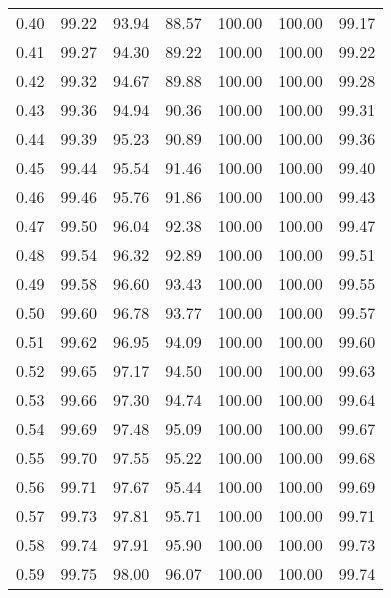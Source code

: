 \begin{tabular}{|c|c|c|c|c|c|c|}
      0.40 &     99.22 &     93.94 &      88.57 &  100.00 &     100.00 &         99.17 \\
      0.41 &     99.27 &     94.30 &      89.22 &  100.00 &     100.00 &         99.22 \\
      0.42 &     99.32 &     94.67 &      89.88 &  100.00 &     100.00 &         99.28 \\
      0.43 &     99.36 &     94.94 &      90.36 &  100.00 &     100.00 &         99.31 \\
      0.44 &     99.39 &     95.23 &      90.89 &  100.00 &     100.00 &         99.36 \\
      0.45 &     99.44 &     95.54 &      91.46 &  100.00 &     100.00 &         99.40 \\
      0.46 &     99.46 &     95.76 &      91.86 &  100.00 &     100.00 &         99.43 \\
      0.47 &     99.50 &     96.04 &      92.38 &  100.00 &     100.00 &         99.47 \\
      0.48 &     99.54 &     96.32 &      92.89 &  100.00 &     100.00 &         99.51 \\
      0.49 &     99.58 &     96.60 &      93.43 &  100.00 &     100.00 &         99.55 \\
      0.50 &     99.60 &     96.78 &      93.77 &  100.00 &     100.00 &         99.57 \\
      0.51 &     99.62 &     96.95 &      94.09 &  100.00 &     100.00 &         99.60 \\
      0.52 &     99.65 &     97.17 &      94.50 &  100.00 &     100.00 &         99.63 \\
      0.53 &     99.66 &     97.30 &      94.74 &  100.00 &     100.00 &         99.64 \\
      0.54 &     99.69 &     97.48 &      95.09 &  100.00 &     100.00 &         99.67 \\
      0.55 &     99.70 &     97.55 &      95.22 &  100.00 &     100.00 &         99.68 \\
      0.56 &     99.71 &     97.67 &      95.44 &  100.00 &     100.00 &         99.69 \\
      0.57 &     99.73 &     97.81 &      95.71 &  100.00 &     100.00 &         99.71 \\
      0.58 &     99.74 &     97.91 &      95.90 &  100.00 &     100.00 &         99.73 \\
      0.59 &     99.75 &     98.00 &      96.07 &  100.00 &     100.00 &         99.74 \\

\end{tabular}
